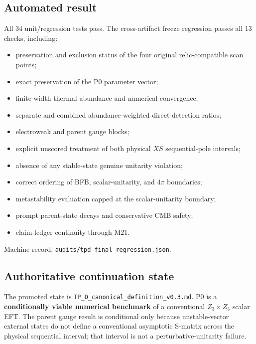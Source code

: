 \documentclass[
]{article}
\providecommand{\tightlist}{%
  \setlength{\itemsep}{0pt}\setlength{\parskip}{0pt}}
\begin{document}
\hypertarget{automated-result}{%
\subsection{Automated result}\label{automated-result}}

All 34 unit/regression tests pass. The cross-artifact freeze regression
passes all 13 checks, including:

\begin{itemize}
\tightlist
\item
  preservation and exclusion status of the four original
  relic-compatible scan points;
\item
  exact preservation of the P0 parameter vector;
\item
  finite-width thermal abundance and numerical convergence;
\item
  separate and combined abundance-weighted direct-detection ratios;
\item
  electroweak and parent gauge blocks;
\item
  explicit unscored treatment of both physical \(XS\) sequential-pole
  intervals;
\item
  absence of any stable-state genuine unitarity violation;
\item
  correct ordering of BFB, scalar-unitarity, and \(4\pi\) boundaries;
\item
  metastability evaluation capped at the scalar-unitarity boundary;
\item
  prompt parent-state decays and conservative CMB safety;
\item
  claim-ledger continuity through M21.
\end{itemize}

Machine record: \texttt{audits/tpd\_final\_regression.json}.

\hypertarget{authoritative-continuation-state}{%
\subsection{Authoritative continuation
state}\label{authoritative-continuation-state}}

The promoted state is \texttt{TP\_D\_canonical\_definition\_v0.3.md}. P0
is a \textbf{conditionally viable numerical benchmark} of a conventional
\(Z_3\times Z_3\) scalar EFT. The parent gauge result is conditional
only because unstable-vector external states do not define a
conventional asymptotic S-matrix across the physical sequential
interval; that interval is not a perturbative-unitarity failure.
\end{document}
